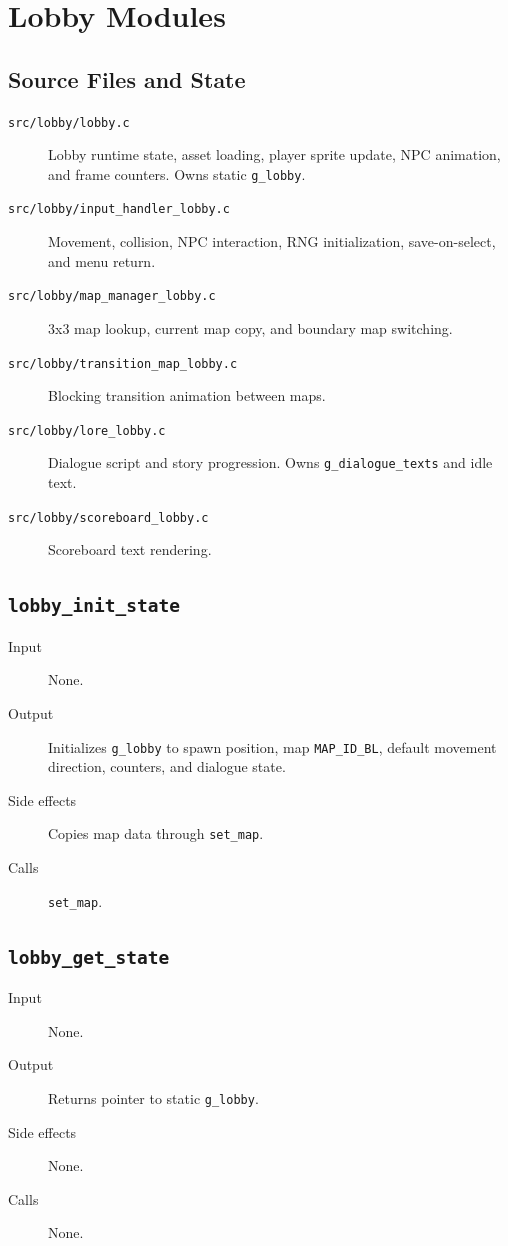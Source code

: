 \section{Lobby Modules}

\subsection{Source Files and State}

\begin{description}
  \item[\texttt{src/lobby/lobby.c}] Lobby runtime state, asset loading, player sprite update, NPC animation, and frame counters. Owns static \texttt{g\_lobby}.
  \item[\texttt{src/lobby/input\_handler\_lobby.c}] Movement, collision, NPC interaction, RNG initialization, save-on-select, and menu return.
  \item[\texttt{src/lobby/map\_manager\_lobby.c}] 3x3 map lookup, current map copy, and boundary map switching.
  \item[\texttt{src/lobby/transition\_map\_lobby.c}] Blocking transition animation between maps.
  \item[\texttt{src/lobby/lore\_lobby.c}] Dialogue script and story progression. Owns \texttt{g\_dialogue\_texts} and idle text.
  \item[\texttt{src/lobby/scoreboard\_lobby.c}] Scoreboard text rendering.
\end{description}

\subsection*{\texttt{lobby\_init\_state}}
\begin{description}
  \item[Input] None.
  \item[Output] Initializes \texttt{g\_lobby} to spawn position, map \texttt{MAP\_ID\_BL}, default movement direction, counters, and dialogue state.
  \item[Side effects] Copies map data through \texttt{set\_map}.
  \item[Calls] \texttt{set\_map}.
\end{description}

\subsection*{\texttt{lobby\_get\_state}}
\begin{description}
  \item[Input] None.
  \item[Output] Returns pointer to static \texttt{g\_lobby}.
  \item[Side effects] None.
  \item[Calls] None.
\end{description}

